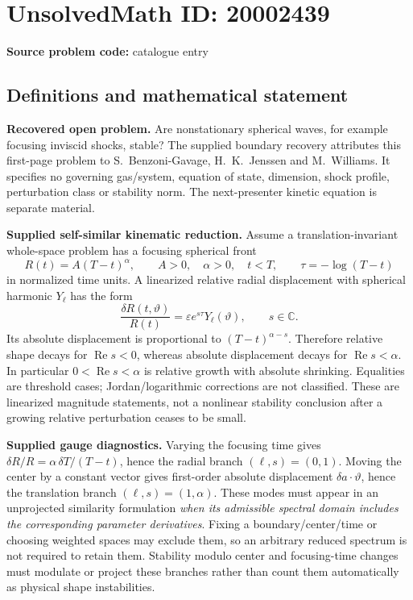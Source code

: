 \documentclass[11pt]{article}
\newcommand{\C}{\mathbb{C}}
\newcommand{\eps}{\varepsilon}
\begin{document}
\section*{UnsolvedMath ID: 20002439}
\textbf{Source problem code:} catalogue entry
\subsection{Definitions and mathematical statement}
\textbf{Recovered open problem.} Are nonstationary spherical waves, for example focusing inviscid shocks, stable? The supplied boundary recovery attributes this first-page problem to S.~Benzoni-Gavage, H.~K.~Jenssen and M.~Williams. It specifies no governing gas/system, equation of state, dimension, shock profile, perturbation class or stability norm. The next-presenter kinetic equation is separate material.

\textbf{Supplied self-similar kinematic reduction.} Assume a translation-invariant whole-space problem has a focusing spherical front
\[
 R(t)=A(T-t)^\alpha,\qquad A>0,\quad\alpha>0,\quad t<T,
 \qquad\tau=-\log(T-t)
\]
in normalized time units. A linearized relative radial displacement with spherical harmonic $Y_\ell$ has the form
\[
 \frac{\delta R(t,\vartheta)}{R(t)}
       =\eps e^{s\tau}Y_\ell(\vartheta),\qquad s\in\C.
\]
Its absolute displacement is proportional to $(T-t)^{\alpha-s}$. Therefore relative shape decays for $\operatorname{Re}s<0$, whereas absolute displacement decays for $\operatorname{Re}s<\alpha$. In particular $0<\operatorname{Re}s<\alpha$ is relative growth with absolute shrinking. Equalities are threshold cases; Jordan/logarithmic corrections are not classified. These are linearized magnitude statements, not a nonlinear stability conclusion after a growing relative perturbation ceases to be small.

\textbf{Supplied gauge diagnostics.} Varying the focusing time gives $\delta R/R=\alpha\,\delta T/(T-t)$, hence the radial branch $(\ell,s)=(0,1)$. Moving the center by a constant vector gives first-order absolute displacement $\delta a\cdot\vartheta$, hence the translation branch $(\ell,s)=(1,\alpha)$. These modes must appear in an unprojected similarity formulation \emph{when its admissible spectral domain includes the corresponding parameter derivatives}. Fixing a boundary/center/time or choosing weighted spaces may exclude them, so an arbitrary reduced spectrum is not required to retain them. Stability modulo center and focusing-time changes must modulate or project these branches rather than count them automatically as physical shape instabilities.
\end{document}
